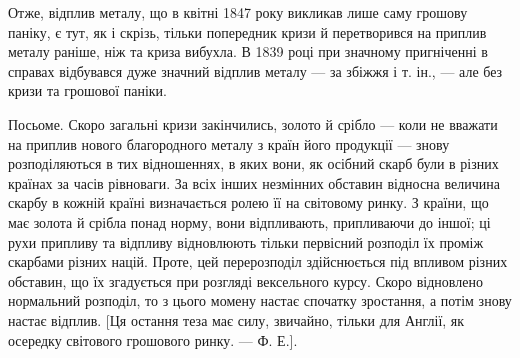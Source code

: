 Отже, відплив металу, що в квітні 1847 року викликав лише саму грошову
паніку, є тут, як і скрізь, тільки попередник кризи й перетворився на
приплив металу раніше, ніж та криза вибухла. В 1839 році при значному пригніченні
в справах відбувався дуже значний відплив металу — за збіжжя і т. ін., —
але без кризи та грошової паніки.

Посьоме. Скоро загальні кризи закінчились, золото й срібло — коли не
вважати на приплив нового благородного металу з країн його продукції —
знову розподіляються в тих відношеннях, в яких вони, як осібний скарб
були в різних країнах за часів рівноваги. За всіх інших незмінних обставин
відносна величина скарбу в кожній країні визначається ролею її на світовому
ринку. З країни, що має золота й срібла понад норму, вони відпливають, припливаючи
до іншої; ці рухи припливу та відпливу відновлюють тільки первісний
розподіл їх проміж скарбами різних націй. Проте, цей перерозподіл здійснюється
під впливом різних обставин, що їх згадується при розгляді вексельного курсу.
Скоро відновлено нормальний розподіл, то з цього момену настає спочатку зростання,
а потім знову настає відплив. [Ця остання теза має силу, звичайно,
тільки для Англії, як осередку світового грошового ринку. — Ф. Е.].
